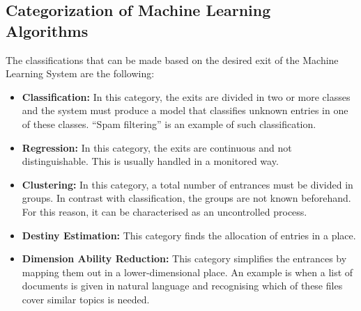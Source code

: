 \subsection{Categorization of Machine Learning Algorithms}\label{211_ref}
The classifications that can be made based on the desired exit of the Machine Learning System are the following:\\
\begin{itemize}

	\item \textbf{Classification:} In this category, the exits are divided in two or more classes and the system must produce a model that classifies unknown entries in one of these classes. ``Spam filtering'' is an example of such classification.
	\item \textbf{Regression:} In this category, the exits are continuous and not distinguishable. This is usually handled in a monitored way.
	\item \textbf{Clustering:} In this category, a total number of entrances must be divided in groups. In contrast with classification, the groups are not known beforehand. For this reason, it can be characterised as an uncontrolled process.
	\item \textbf{Destiny Estimation:} This category finds the allocation of entries in a place.
	\item \textbf{Dimension Ability Reduction:} This category simplifies the entrances by mapping them out in a lower-dimensional place. An example is when a list of documents is given in natural language and recognising which of these files cover similar topics is needed.\\

\end{itemize}

